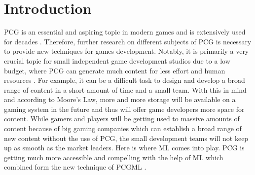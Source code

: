 \documentclass[MGS,Master,english]{twbook}%
\begin{document}
{{{    \newcommand{\citefigm}[2]{(Source: taken with modification from \protect\cite{#1}, p. #2)}%
    \newcommand{\citep}{\citeasnoun}%
    \newcommand{\acessedthrough}{Available at:}%
    \newcommand{\acessedthroughp}{Available through:}%
    \newcommand{\acessedat}{Accessed}%
    \newcommand{\singlepage}{p.}%
    \newcommand{\multiplepages}{pp.}%
    \newcommand{\chapternr}{Ch.}%
    \renewcommand{\harvardand}{\&}%
    \newcommand{\abstractonly}{Abstract only}
    \newcommand{\edition}{~edition}%
}}}

\maketitle

%
%
\chapter{Introduction}
\ac{PCG} is an essential and aspiring topic in modern games and is extensively used for decades \cite{pcg::whatIsPCG}. Therefore, further research on different subjects of \ac{PCG} is necessary to provide new techniques for games development. Notably, it is primarily a very crucial topic for small independent game development studios due to a low budget, where \ac{PCG} can generate much content for less effort and human resources \cite{pcg::shortHistoryOfDynamicAndPCG}. For example, it can be a difficult task to design and develop a broad range of content in a short amount of time and a small team. With this in mind and according to Moore’s Law, more and more storage will be available on a gaming system in the future and thus will offer game developers more space for content. While gamers and players will be getting used to massive amounts of content because of big gaming companies which can establish a broad range of new content without the use of \ac{PCG}, the small development teams will not keep up as smooth as the market leaders. Here is where \ac{ML} comes into play. \ac{PCG} is getting much more accessible and compelling with the help of \ac{ML} which combined form the new technique of \ac{PCGML} \cite{pcgml::paper}.
\end{document}
